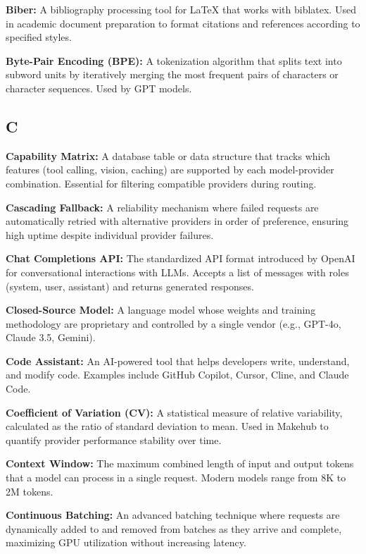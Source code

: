 \documentclass[english]{article}
\begin{document}
\textbf{Biber:} A bibliography processing tool for LaTeX that works with biblatex. Used in academic document preparation to format citations and references according to specified styles.

\textbf{Byte-Pair Encoding (BPE):} A tokenization algorithm that splits text into subword units by iteratively merging the most frequent pairs of characters or character sequences. Used by GPT models.

\subsection*{C}

\textbf{Capability Matrix:} A database table or data structure that tracks which features (tool calling, vision, caching) are supported by each model-provider combination. Essential for filtering compatible providers during routing.

\textbf{Cascading Fallback:} A reliability mechanism where failed requests are automatically retried with alternative providers in order of preference, ensuring high uptime despite individual provider failures.

\textbf{Chat Completions API:} The standardized API format introduced by OpenAI for conversational interactions with LLMs. Accepts a list of messages with roles (system, user, assistant) and returns generated responses.

\textbf{Closed-Source Model:} A language model whose weights and training methodology are proprietary and controlled by a single vendor (e.g., GPT-4o, Claude 3.5, Gemini).

\textbf{Code Assistant:} An AI-powered tool that helps developers write, understand, and modify code. Examples include GitHub Copilot, Cursor, Cline, and Claude Code.

\textbf{Coefficient of Variation (CV):} A statistical measure of relative variability, calculated as the ratio of standard deviation to mean. Used in Makehub to quantify provider performance stability over time.

\textbf{Context Window:} The maximum combined length of input and output tokens that a model can process in a single request. Modern models range from 8K to 2M tokens.

\textbf{Continuous Batching:} An advanced batching technique where requests are dynamically added to and removed from batches as they arrive and complete, maximizing GPU utilization without increasing latency.
\end{document}
